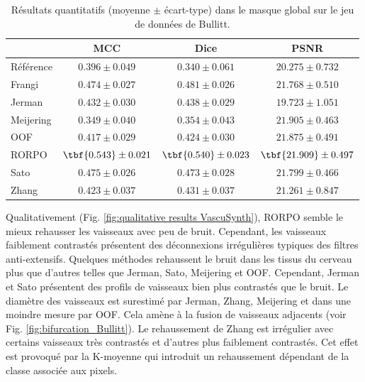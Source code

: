 \begin{table}[H]
  \begin{center}
      \caption{Résultats quantitatifs (moyenne $\pm$ écart-type) dans le masque global \maskglobal sur le jeu de données de Bullitt.}
      \label{tab:quantitative results Bullit}
  \begin{tabular}{lccc}
      \hline
          & MCC & Dice & PSNR \\ 
      \hline
      Référence	  & $ 0.396 \pm 0.049 $ & $ 0.340 \pm 0.061 $ & $ 20.275 \pm	0.732 $ \\ 
      Frangi	    & $ 0.474 \pm 0.027 $ & $ 0.481 \pm 0.026 $ & $ 21.768 \pm	0.510 $ \\ 
      Jerman	    & $ 0.432 \pm 0.030 $ & $ 0.438 \pm 0.029 $ & $ 19.723 \pm	1.051 $ \\ 
      Meijering	  & $ 0.349 \pm 0.040 $ & $ 0.354 \pm 0.043 $ & $ 21.905 \pm	0.463 $ \\ 
      OOF	        & $ 0.417 \pm 0.029 $ & $ 0.424 \pm 0.030 $ & $ 21.875 \pm	0.491 $ \\ 
      RORPO	      & $ \tbf{0.543} \pm 0.021 $ & $ \tbf{0.540} \pm 0.023 $ & $ \tbf{21.909} \pm	0.497 $ \\ 
      Sato	      & $ 0.475 \pm 0.026 $ & $ 0.473 \pm 0.028 $ & $ 21.799 \pm	0.466 $ \\ 
      Zhang	      & $ 0.423 \pm 0.037 $ & $ 0.431 \pm 0.037 $ & $ 21.261 \pm	0.847 $ \\ 

      \hline
  \end{tabular} 
\end{center}
\end{table}

Qualitativement (Fig. \ref{fig:qualitative results VascuSynth}), RORPO semble le mieux rehausser les vaisseaux avec peu de bruit. Cependant, les vaisseaux faiblement contrastés présentent des déconnexions irrégulières typiques des filtres anti-extensifs. Quelques méthodes rehaussent le bruit dans les tissus du cerveau plus que d'autres telles que Jerman, Sato, Meijering et OOF. Cependant, Jerman et Sato présentent des profils de vaisseaux bien plus contrastés que le bruit. Le diamètre des vaisseaux est surestimé par Jerman, Zhang, Meijering et dans une moindre mesure par OOF. Cela amène à la fusion de vaisseaux adjacents (voir Fig. \ref{fig:bifurcation_Bullitt}). Le rehaussement de Zhang est irrégulier avec certains vaisseaux très contrastés et d'autres plus faiblement contrastés. Cet effet est provoqué par la K-moyenne qui introduit un rehaussement dépendant de la classe associée aux pixels.

